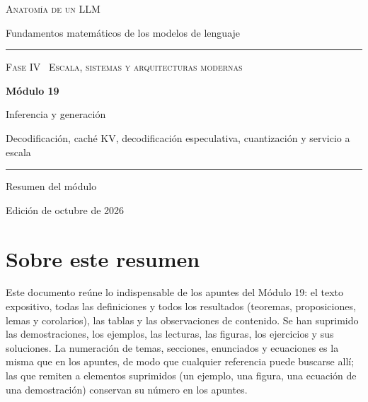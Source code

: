 \documentclass[11pt,a4paper,twoside,openany]{book}
\begin{document}
\frontmatter
\begin{titlepage}
\centering
\vspace*{2.5cm}
{\large\scshape Anatomía de un LLM}\par
\vspace{0.4cm}
{\normalsize Fundamentos matemáticos de los modelos de lenguaje}\par
\vspace{2.2cm}
\rule{\textwidth}{0.8pt}\par\vspace{0.5cm}
{\small\scshape Fase IV \textperiodcentered\ Escala, sistemas y arquitecturas modernas}\par\vspace{0.3cm}
{\Huge\bfseries Módulo 19\par}\vspace{0.3cm}
{\LARGE Inferencia y generación\par}
\vspace{0.2cm}
{\large Decodificación, caché KV, decodificación especulativa, cuantización y servicio a escala\par}
\vspace{0.5cm}\rule{\textwidth}{0.4pt}\par
\vspace{1.6cm}
{\large Resumen del módulo}\par
\vfill
{\small Edición de octubre de 2026}\par
\end{titlepage}

\chapter*{Sobre este resumen}

Este documento reúne lo indispensable de los apuntes del Módulo 19: el texto expositivo, todas las definiciones y todos los resultados (teoremas, proposiciones, lemas y corolarios), las tablas y las observaciones de contenido. Se han suprimido las demostraciones, los ejemplos, las lecturas, las figuras, los ejercicios y sus soluciones. La numeración de temas, secciones, enunciados y ecuaciones es la misma que en los apuntes, de modo que cualquier referencia puede buscarse allí; las que remiten a elementos suprimidos (un ejemplo, una figura, una ecuación de una demostración) conservan su número en los apuntes.
\end{document}
